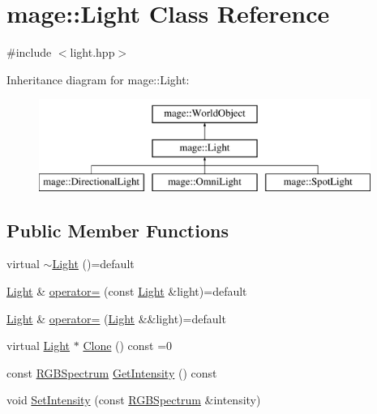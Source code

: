 \hypertarget{classmage_1_1_light}{}\section{mage\+:\+:Light Class Reference}
\label{classmage_1_1_light}


{\ttfamily \#include $<$light.\+hpp$>$}

Inheritance diagram for mage\+:\+:Light\+:\begin{figure}[H]
\begin{center}
\leavevmode
\includegraphics[height=3.000000cm]{classmage_1_1_light}
\end{center}
\end{figure}
\subsection*{Public Member Functions}
\begin{DoxyCompactItemize}
\item 
virtual \hyperlink{classmage_1_1_light_a56971b15195b704f8c251bae766625ac}{$\sim$\+Light} ()=default
\item 
\hyperlink{classmage_1_1_light}{Light} \& \hyperlink{classmage_1_1_light_aa72536c3b0f41a6df91fbc7d0e724a9c}{operator=} (const \hyperlink{classmage_1_1_light}{Light} \&light)=default
\item 
\hyperlink{classmage_1_1_light}{Light} \& \hyperlink{classmage_1_1_light_a59b74b31c7424f616f447eedf54155c7}{operator=} (\hyperlink{classmage_1_1_light}{Light} \&\&light)=default
\item 
virtual \hyperlink{classmage_1_1_light}{Light} $\ast$ \hyperlink{classmage_1_1_light_aada77583072dd108e5cf86257225b768}{Clone} () const =0
\item 
const \hyperlink{structmage_1_1_r_g_b_spectrum}{R\+G\+B\+Spectrum} \hyperlink{classmage_1_1_light_a344a6297a3933681cdc21bc5338a544c}{Get\+Intensity} () const
\item 
void \hyperlink{classmage_1_1_light_a24ea7425d31fcb28990f27daa1bd67ce}{Set\+Intensity} (const \hyperlink{structmage_1_1_r_g_b_spectrum}{R\+G\+B\+Spectrum} \&intensity)
\end{DoxyCompactItemize}
